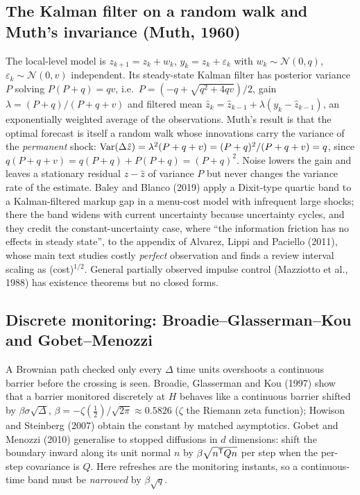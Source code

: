 \subsection{The Kalman filter on a random walk and Muth's invariance (Muth, 1960)}

The local-level model is $z_{k+1} = z_k + w_k$, $y_k = z_k + \varepsilon_k$ with $w_k \sim \mathcal N(0,q)$, $\varepsilon_k \sim \mathcal N(0,v)$ independent. Its steady-state Kalman filter has posterior variance $P$ solving $P(P+q) = qv$, i.e.\ $P = (-q + \sqrt{q^2 + 4qv})/2$, gain $\lambda = (P+q)/(P+q+v)$ and filtered mean $\hat z_k = \hat z_{k-1} + \lambda(y_k - \hat z_{k-1})$, an exponentially weighted average of the observations. Muth's result is that the optimal forecast is itself a random walk whose innovations carry the variance of the \emph{permanent} shock: $\operatorname{Var}(\Delta\hat z) = \lambda^2(P+q+v) = (P+q)^2/(P+q+v) = q$, since $q(P+q+v) = q(P+q) + P(P+q) = (P+q)^2$. Noise lowers the gain and leaves a stationary residual $z - \hat z$ of variance $P$ but never changes the variance rate of the estimate. Baley and Blanco (2019) apply a Dixit-type quartic band to a Kalman-filtered markup gap in a menu-cost model with infrequent large shocks; there the band widens with current uncertainty because uncertainty cycles, and they credit the constant-uncertainty case, where ``the information friction has no effects in steady state'', to the appendix of Alvarez, Lippi and Paciello (2011), whose main text studies costly \emph{perfect} observation and finds a review interval scaling as (cost)$^{1/2}$. General partially observed impulse control (Mazziotto et al., 1988) has existence theorems but no closed forms.

\subsection{Discrete monitoring: Broadie--Glasserman--Kou and Gobet--Menozzi}

A Brownian path checked only every $\Delta$ time units overshoots a continuous barrier before the crossing is seen. Broadie, Glasserman and Kou (1997) show that a barrier monitored discretely at $H$ behaves like a continuous barrier shifted by $\beta\sigma\sqrt\Delta$, $\beta = -\zeta(\tfrac12)/\sqrt{2\pi} \approx 0.5826$ ($\zeta$ the Riemann zeta function); Howison and Steinberg (2007) obtain the constant by matched asymptotics. Gobet and Menozzi (2010) generalise to stopped diffusions in $d$ dimensions: shift the boundary inward along its unit normal $n$ by $\beta\sqrt{n^{\mathsf{T}} Qn}$ per step when the per-step covariance is $Q$. Here refreshes are the monitoring instants, so a continuous-time band must be \emph{narrowed} by $\beta\sqrt q$.


